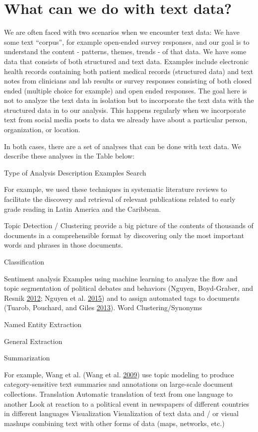 \documentclass[]{krantz}
\begin{document}
\section{What can we do with text
data?}\label{what-can-we-do-with-text-data}

We are often faced with two scenarios when we encounter text data: We
have some text ``corpus'', for example open-ended survey responses, and
our goal is to understand the content - patterns, themes, trends - of
that data. We have some data that consists of both structured and text
data. Examples include electronic health records containing both patient
medical records (structured data) and text notes from clinicians and lab
results or survey responses consisting of both closed ended (multiple
choice for example) and open ended responses. The goal here is not to
analyze the text data in isolation but to incorporate the text data with
the structured data in to our analysis. This happens regularly when we
incorporate text from social media posts to data we already have about a
particular person, organization, or location.

In both cases, there are a set of analyses that can be done with text
data. We describe these analyses in the Table below:

Type of Analysis Description Examples Search

For example, we used these techniques in systematic literature reviews
to facilitate the discovery and retrieval of relevant publications
related to early grade reading in Latin America and the Caribbean.

Topic Detection / Clustering provide a big picture of the contents of
thousands of documents in a comprehensible format by discovering only
the most important words and phrases in those documents.

Classification

Sentiment analysis Examples using machine learning to analyze the flow
and topic segmentation of political debates and behaviors (Nguyen,
Boyd-Graber, and Resnik \protect\hyperlink{ref-nguyen-12}{2012}; Nguyen
et al.
\protect\hyperlink{ref-Nguyen:Boyd-Graber:Resnik:Miler-2015}{2015}) and
to assign automated tags to documents (Tuarob, Pouchard, and Giles
\protect\hyperlink{ref-tuarob-13}{2013}). Word Clustering/Synonyms

Named Entity Extraction

General Extraction

Summarization

For example, Wang et al. (Wang et al.
\protect\hyperlink{ref-wang-09}{2009}) use topic modeling to produce
category-sensitive text summaries and annotations on large-scale
document collections. Translation Automatic translation of text from one
language to another Look at reaction to a political event in newspapers
of different countries in different languages Visualization
Visualization of text data and / or visual mashups combining text with
other forms of data (maps, networks, etc.)
\end{document}
